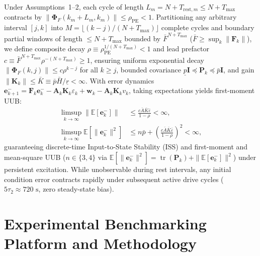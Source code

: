 \documentclass[preprint,12pt]{elsarticle}
\begin{document}
Under Assumptions~1--2, each cycle of length $L_m = N + T_{\text{rest},m} \le N + T_{\max}$ contracts by $\|\boldsymbol{\Phi}_F(k_m+L_m, k_m)\| \le \rho_{\text{PE}} < 1$. Partitioning any arbitrary interval $[j, k]$ into $M = \lfloor (k-j)/(N+T_{\max}) \rfloor$ complete cycles and boundary partial windows of length $\le N+T_{\max}$ bounded by $\bar{F}^{N+T_{\max}}$ ($\bar{F} \ge \sup_k \|\mathbf{F}_k\|$), we define composite decay $\rho \equiv \rho_{\text{PE}}^{1/(N+T_{\max})} < 1$ and lead prefactor $c \equiv \bar{F}^{N+T_{\max}} \rho^{-(N+T_{\max})} \ge 1$, ensuring uniform exponential decay $\|\boldsymbol{\Phi}_F(k, j)\| \le c \rho^{k-j}$ for all $k \ge j$, bounded covariance $\underline{p}\mathbf{I} \preceq \mathbf{P}_k \preceq \bar{p}\mathbf{I}$, and gain $\|\mathbf{K}_k\| \le \bar{K} \equiv \bar{p}\bar{H}/\underline{r} < \infty$. With error dynamics $\mathbf{e}_{k+1}^- = \mathbf{F}_k \mathbf{e}_k^- - \mathbf{A}_k \mathbf{K}_k \varepsilon_k + \mathbf{w}_k - \mathbf{A}_k \mathbf{K}_k v_k$, taking expectations yields first-moment UUB:
\begin{align}
\limsup_{k \to \infty} \|\mathbb{E}[\mathbf{e}_k^-]\| &\le \frac{c \bar{A} \bar{K} \bar{\varepsilon}}{1 - \rho} < \infty, \label{eqn:bibs_pidkf}\\
\limsup_{k \to \infty} \mathbb{E}[\|\mathbf{e}_k^-\|^2] &\le n\bar{p} + \left(\frac{c \bar{A} \bar{K} \bar{\varepsilon}}{1 - \rho}\right)^2 < \infty, \label{eqn:ms_pidkf}
\end{align}
guaranteeing discrete-time Input-to-State Stability (ISS) and first-moment and mean-square UUB ($n \in \{3, 4\}$ via $\mathbb{E}[\|\mathbf{e}_k^-\|^2] = \operatorname{tr}(\mathbf{P}_k) + \|\mathbb{E}[\mathbf{e}_k^-]\|^2$) under persistent excitation. While unobservable during rest intervals, any initial condition error contracts rapidly under subsequent active drive cycles ($5\tau_2 \approx 720\text{ s}$, zero steady-state bias).
\section{Experimental Benchmarking Platform and Methodology\label{sec:exp_setup}}
\end{document}
